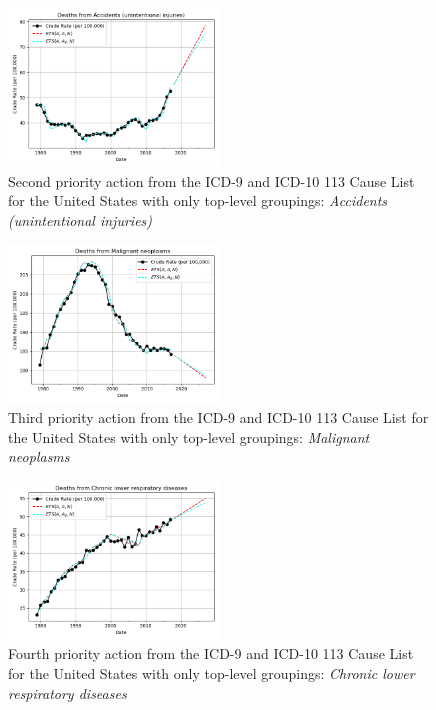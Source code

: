 \documentclass[10pt, a4paper, twocolumn]{IEEEconf}
\begin{document}
\begin{figure}[H]
  \centering
  \includegraphics[width=0.5\textwidth]{results/US_ICD_113_SELECTED_CAUSES_ROOTS/Accidents_unintentional_injuries_ets.png}
  \caption{Second priority action from the ICD-9 and ICD-10 113 Cause List for the United States with only top-level groupings: \textit{Accidents (unintentional injuries)}}\label{fig:k4b}
\end{figure}

\begin{figure}[H]
  \centering
  \includegraphics[width=0.5\textwidth]{results/US_ICD_113_SELECTED_CAUSES_ROOTS/Malignant_neoplasms_ets.png}
  \caption{Third priority action from the ICD-9 and ICD-10 113 Cause List for the United States with only top-level groupings: \textit{Malignant neoplasms}}\label{fig:k4c}
\end{figure}

\begin{figure}[H]
  \centering
  \includegraphics[width=0.5\textwidth]{results/US_ICD_113_SELECTED_CAUSES_ROOTS/Chronic_lower_respiratory_diseases_ets.png}
  \caption{Fourth priority action from the ICD-9 and ICD-10 113 Cause List for the United States with only top-level groupings: \textit{Chronic lower respiratory diseases}}\label{fig:k4d}
\end{figure}
\end{document}
